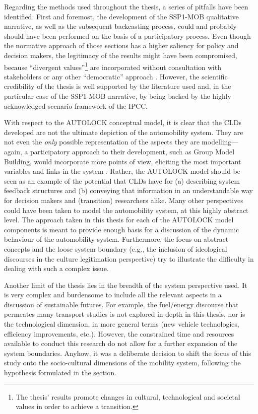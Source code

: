 Regarding the methods used throughout the thesis, a series of pitfalls have been identified. First and foremost, the development of the SSP1-MOB qualitative narrative, as well as the subsequent backcasting process, could and probably should have been performed on the basis of a participatory process. Even though the normative approach of those sections has a higher saliency for policy and decision makers, the legitimacy of the results might have been compromised, because ``divergent values''\footnote{The thesis' results promote changes in cultural, technological and societal values in order to achieve a transition.} are incorporated without consultation with stakeholders or any other ``democratic'' approach \parencite{rounsevell2010_Developingqualitativescenario}. However, the scientific credibility of the thesis is well supported by the literature used and, in the particular case of the SSP1-MOB narrative, by being backed by the highly acknowledged scenario framework of the IPCC.

With respect to the AUTOLOCK conceptual model, it is clear that the CLDs developed are not the ultimate depiction of the automobility system. They are not even the \emph{only} possible representation of the aspects they are modelling---again, a participatory approach to their development, such as Group Model Building, would incorporate more points of view, eliciting the most important variables and links in the system \parencite{laurenti2014_GroupModelBuilding}. Rather, the AUTOLOCK model should be seen as an example of the potential that CLDs have for (a) describing system feedback structures and (b) conveying that information in an understandable way for decision makers and (transition) researchers alike. Many other perspectives could have been taken to model the automobility system, at this highly abstract level. The approach taken in this thesis for each of the AUTOLOCK model components is meant to provide enough basis for a discussion of the dynamic behaviour of the automobility system. Furthermore, the focus on abstract concepts and the loose system boundary (e.g., the inclusion of ideological discourses in the culture legitimation perspective) try to illustrate the difficulty in dealing with such a complex issue.

Another limit of the thesis lies in the breadth of the system perspective used. It is very complex and burdensome to include all the relevant aspects in a discussion of sustainable futures. For example, the fuel/energy discourse that permeates many transport studies is not explored in-depth in this thesis, nor is the technological dimension, in more general terms (new vehicle technologies, efficiency improvements, etc.). However, the constrained time and resources available to conduct this research do not allow for a further expansion of the system boundaries. Anyhow, it was a deliberate decision to shift the focus of this study onto the socio-cultural dimensions of the mobility system, following the hypothesis formulated in the  section.

